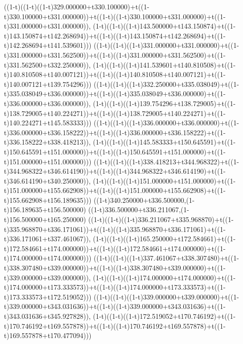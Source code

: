 ((1-t)((1-t)((1-t)329.000000+t330.100000)+t((1-t)330.100000+t331.000000))+t((1-t)((1-t)330.100000+t331.000000)+t((1-t)331.000000+t331.000000)),                                     (1-t)((1-t)((1-t)143.500000+t143.150874)+t((1-t)143.150874+t142.268694))+t((1-t)((1-t)143.150874+t142.268694)+t((1-t)142.268694+t141.539601)))
((1-t)((1-t)((1-t)331.000000+t331.000000)+t((1-t)331.000000+t331.562500))+t((1-t)((1-t)331.000000+t331.562500)+t((1-t)331.562500+t332.250000)),                                     (1-t)((1-t)((1-t)141.539601+t140.810508)+t((1-t)140.810508+t140.007121))+t((1-t)((1-t)140.810508+t140.007121)+t((1-t)140.007121+t139.754296)))
((1-t)((1-t)((1-t)332.250000+t335.038049)+t((1-t)335.038049+t336.000000))+t((1-t)((1-t)335.038049+t336.000000)+t((1-t)336.000000+t336.000000)),                                     (1-t)((1-t)((1-t)139.754296+t138.729005)+t((1-t)138.729005+t140.224271))+t((1-t)((1-t)138.729005+t140.224271)+t((1-t)140.224271+t145.583333)))
((1-t)((1-t)((1-t)336.000000+t336.000000)+t((1-t)336.000000+t336.158222))+t((1-t)((1-t)336.000000+t336.158222)+t((1-t)336.158222+t338.418213)),                                     (1-t)((1-t)((1-t)145.583333+t150.645591)+t((1-t)150.645591+t151.000000))+t((1-t)((1-t)150.645591+t151.000000)+t((1-t)151.000000+t151.000000)))
((1-t)((1-t)((1-t)338.418213+t344.968322)+t((1-t)344.968322+t346.614190))+t((1-t)((1-t)344.968322+t346.614190)+t((1-t)346.614190+t340.250000)),                                     (1-t)((1-t)((1-t)151.000000+t151.000000)+t((1-t)151.000000+t155.662908))+t((1-t)((1-t)151.000000+t155.662908)+t((1-t)155.662908+t156.189635)))
((1-t)340.250000+t336.500000,(1-t)156.189635+t156.500000)
((1-t)336.500000+t336.211067,(1-t)156.500000+t165.250000)
((1-t)((1-t)((1-t)336.211067+t335.968870)+t((1-t)335.968870+t336.171061))+t((1-t)((1-t)335.968870+t336.171061)+t((1-t)336.171061+t337.461067)),                                     (1-t)((1-t)((1-t)165.250000+t172.584661)+t((1-t)172.584661+t174.000000))+t((1-t)((1-t)172.584661+t174.000000)+t((1-t)174.000000+t174.000000)))
((1-t)((1-t)((1-t)337.461067+t338.307480)+t((1-t)338.307480+t339.000000))+t((1-t)((1-t)338.307480+t339.000000)+t((1-t)339.000000+t339.000000)),                                     (1-t)((1-t)((1-t)174.000000+t174.000000)+t((1-t)174.000000+t173.333573))+t((1-t)((1-t)174.000000+t173.333573)+t((1-t)173.333573+t172.519052)))
((1-t)((1-t)((1-t)339.000000+t339.000000)+t((1-t)339.000000+t343.031636))+t((1-t)((1-t)339.000000+t343.031636)+t((1-t)343.031636+t345.927828)),                                     (1-t)((1-t)((1-t)172.519052+t170.746192)+t((1-t)170.746192+t169.557878))+t((1-t)((1-t)170.746192+t169.557878)+t((1-t)169.557878+t170.477094)))
